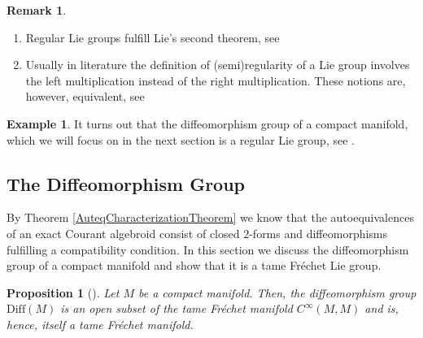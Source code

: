 \documentclass[12pt,a4paper]{article}
\theoremstyle{plain}
\newtheorem{proposition}[theorem]{Proposition}
\theoremstyle{definition}
\newtheorem{example}[theorem]{Example}
\newtheorem{remark}[theorem]{Remark}
\newcommand{\Diff}{\mathrm{Diff}(M)}
\begin{document}
\begin{remark}
\begin{enumerate}
    \item Regular Lie groups fulfill Lie's second theorem, see \cite[Remark 3.32 (b)]{schmeding_2022}
    \item Usually in literature the definition of (semi)regularity of a Lie group involves the left multiplication instead of the right multiplication. These notions are, however, equivalent, see \cite[Remark 3.32 (c)]{schmeding_2022}
\end{enumerate}
\end{remark}

\begin{example}
\label{Ex:DiffRegLieGr}
It turns out that the diffeomorphism group of a compact manifold, which we will focus on in the next section is a regular Lie group, see \cite[3.36 Example]{schmeding_2022}.
\end{example}


\subsection{The Diffeomorphism Group}

By Theorem \ref{AuteqCharacterizationTheorem} we know that the autoequivalences of an exact Courant algebroid consist of closed $2$-forms and diffeomorphisms fulfilling a compatibility condition. In this section we discuss the diffeomorphism group of a compact manifold and show that it is a tame Fréchet Lie group.


\begin{proposition}[{\cite[Chapter III, Proposition 1.10]{StableMappings}}]
\label{Prop:DiffOpen}
Let $M$ be a compact manifold. Then, the diffeomorphism group $\Diff$ is an open subset of the tame Fréchet manifold $C^\infty(M,M)$ and is, hence, itself a tame Fréchet manifold. \end{proposition}
\end{document}
